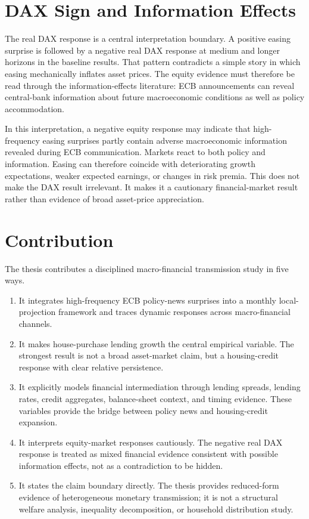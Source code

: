 \section{DAX Sign and Information Effects}

The real DAX response is a central interpretation boundary. A positive easing surprise is followed by a negative real DAX response at medium and longer horizons in the baseline results. That pattern contradicts a simple story in which easing mechanically inflates asset prices. The equity evidence must therefore be read through the information-effects literature: ECB announcements can reveal central-bank information about future macroeconomic conditions as well as policy accommodation.

In this interpretation, a negative equity response may indicate that high-frequency easing surprises partly contain adverse macroeconomic information revealed during ECB communication. Markets react to both policy and information. Easing can therefore coincide with deteriorating growth expectations, weaker expected earnings, or changes in risk premia. This does not make the DAX result irrelevant. It makes it a cautionary financial-market result rather than evidence of broad asset-price appreciation.

\section{Contribution}

The thesis contributes a disciplined macro-financial transmission study in five ways.

\begin{enumerate}
  \item It integrates high-frequency ECB policy-news surprises into a monthly local-projection framework and traces dynamic responses across macro-financial channels.

  \item It makes house-purchase lending growth the central empirical variable. The strongest result is not a broad asset-market claim, but a housing-credit response with clear relative persistence.

  \item It explicitly models financial intermediation through lending spreads, lending rates, credit aggregates, balance-sheet context, and timing evidence. These variables provide the bridge between policy news and housing-credit expansion.

  \item It interprets equity-market responses cautiously. The negative real DAX response is treated as mixed financial evidence consistent with possible information effects, not as a contradiction to be hidden.

  \item It states the claim boundary directly. The thesis provides reduced-form evidence of heterogeneous monetary transmission; it is not a structural welfare analysis, inequality decomposition, or household distribution study.
\end{enumerate}

